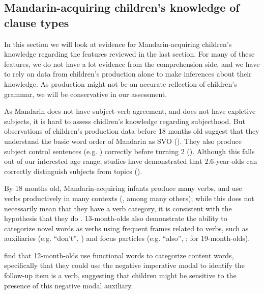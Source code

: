 \subsection{Mandarin-acquiring children's knowledge of clause types}
\label{sec:mancl:bg:child}
In this section we will look at evidence for Mandarin-acquiring children's knowledge regarding the features reviewed in the last section. For many of these features, we do not have a lot evidence from the comprehension side, and we have to rely on data from children's production alone to make inferences about their knowledge. As production might not be an accurate reflection of children's grammar, we will be conservative in our assessment.   

   As Mandarin does not have subject-verb agreement, and does not have expletive subjects, it is hard to assess chidlren's knowledge regarding subjecthood. But observations of children's production data before 18 months old suggest that they understand the basic word order of Mandarin as SVO (\cite{tardif1993verb,tardif1996verb}). They also produce subject control sentences (e.g. ) correctly before turning 2 (\cite{yang2015control}). Although this falls out of our interested age range, studies have demonstrated that 2.6-year-olds can correctly distinguish subjects from topics (\cite{chien1985subj}). 

 By 18 months old, Mandarin-acquiring infants produce many verbs, and use verbs productively in many contexts (\cite{tardif1993verb,tardif1996verb, xiaolee2006,zhangshili2015infant}, among many others); while this does not necessarily mean that they have a verb category, it is consistent with the hypothesis that they do . 13-month-olds also demonstrate the ability to categorize novel words as verbs using frequent frames related to verbs, such as auxiliaries (e.g.  ``don't'', \cite{zhang2015bie}) and focus particles (e.g.  ``also'', \cite{zhangshili2015infant}; \cite{ying2021func} for 19-month-olds).

  \cite{zhang2015bie} find that 12-month-olds use functional words to categorize content words, specifically that they could use the negative imperative modal  to identify the follow-up item is a verb, suggesting that children might be sensitive to the presence of this negative modal auxiliary.  %


